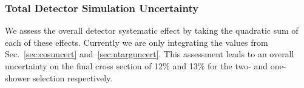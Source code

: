 %

\subsubsection{Total Detector Simulation Uncertainty}
	
We assess the overall detector systematic effect by taking the quadratic sum of each of these effects. Currently we are only integrating the values from Sec.~\ref{sec:cosuncert} and~\ref{sec:ntarguncert}.  This assessment leads to an overall uncertainty on the final cross section of 12\% and 13\% for the two- and one-shower selection respectively. 

